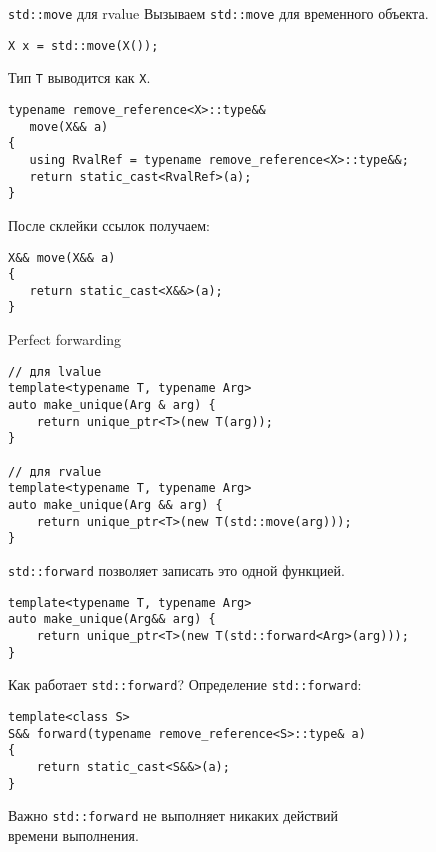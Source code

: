 \documentclass{beamer}
\begin{document}
\begin{frame}[fragile]{{\tt std::move} для rvalue}
Вызываем \texttt{std::move} для временного объекта.
\begin{lstlisting}
X x = std::move(X());
\end{lstlisting}
Тип \texttt{T} выводится как \texttt{X}.
    \begin{lstlisting}
typename remove_reference<X>::type&&
   move(X&& a) 
{
   using RvalRef = typename remove_reference<X>::type&&;
   return static_cast<RvalRef>(a);
} 
    \end{lstlisting}
После склейки ссылок получаем:
    \begin{lstlisting}
X&& move(X&& a) 
{
   return static_cast<X&&>(a);
} 
    \end{lstlisting}

\end{frame}


\begin{frame}[fragile]{Perfect forwarding}
    \begin{lstlisting}
// для lvalue
template<typename T, typename Arg> 
auto make_unique(Arg & arg) { 
    return unique_ptr<T>(new T(arg));
} 

// для rvalue
template<typename T, typename Arg> 
auto make_unique(Arg && arg) { 
    return unique_ptr<T>(new T(std::move(arg)));
} 
    \end{lstlisting}

\texttt{std::forward} позволяет записать это одной функцией.
    \begin{lstlisting}
template<typename T, typename Arg> 
auto make_unique(Arg&& arg) { 
    return unique_ptr<T>(new T(std::forward<Arg>(arg)));
} 
    \end{lstlisting}
\end{frame}

\begin{frame}[fragile]{Как работает \texttt{std::forward}?}
Определение \texttt{std::forward}:
    \begin{lstlisting}
template<class S>
S&& forward(typename remove_reference<S>::type& a) 
{
    return static_cast<S&&>(a);
} 
    \end{lstlisting}

\begin{block}{Важно}
    \texttt{std::forward} не выполняет никаких действий\\
    времени выполнения.
\end{block}
\end{frame}
\end{document}

